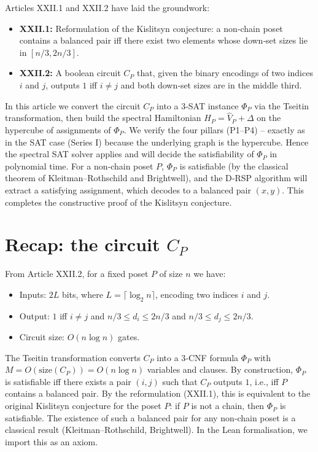 \documentclass[11pt,a4paper]{article}
\begin{document}
Articles XXII.1 and XXII.2 have laid the groundwork:
\begin{itemize}
\item \textbf{XXII.1:} Reformulation of the Kislitsyn conjecture: a non‑chain poset contains a balanced pair iff there exist two elements whose down‑set sizes lie in $[n/3, 2n/3]$.
\item \textbf{XXII.2:} A boolean circuit $C_P$ that, given the binary encodings of two indices $i$ and $j$, outputs $1$ iff $i \neq j$ and both down‑set sizes are in the middle third.
\end{itemize}
In this article we convert the circuit $C_P$ into a 3‑SAT instance $\Phi_P$ via the Tseitin transformation, then build the spectral Hamiltonian $H_P = \hat{V}_P + \Delta$ on the hypercube of assignments of $\Phi_P$. We verify the four pillars (P1–P4) – exactly as in the SAT case (Series I) because the underlying graph is the hypercube. Hence the spectral SAT solver applies and will decide the satisfiability of $\Phi_P$ in polynomial time. For a non‑chain poset $P$, $\Phi_P$ is satisfiable (by the classical theorem of Kleitman–Rothschild and Brightwell), and the D‑RSP algorithm will extract a satisfying assignment, which decodes to a balanced pair $(x,y)$. This completes the constructive proof of the Kislitsyn conjecture.

\section{Recap: the circuit $C_P$}

From Article XXII.2, for a fixed poset $P$ of size $n$ we have:
\begin{itemize}
\item Inputs: $2L$ bits, where $L = \lceil \log_2 n\rceil$, encoding two indices $i$ and $j$.
\item Output: $1$ iff $i \neq j$ and $n/3 \le d_i \le 2n/3$ and $n/3 \le d_j \le 2n/3$.
\item Circuit size: $O(n \log n)$ gates.
\end{itemize}

The Tseitin transformation converts $C_P$ into a 3‑CNF formula $\Phi_P$ with $M = O(\text{size}(C_P)) = O(n \log n)$ variables and clauses. By construction, $\Phi_P$ is satisfiable iff there exists a pair $(i,j)$ such that $C_P$ outputs $1$, i.e., iff $P$ contains a balanced pair. By the reformulation (XXII.1), this is equivalent to the original Kislitsyn conjecture for the poset $P$: if $P$ is not a chain, then $\Phi_P$ is satisfiable. The existence of such a balanced pair for any non‑chain poset is a classical result (Kleitman–Rothschild, Brightwell). In the Lean formalisation, we import this as an axiom.
\end{document}
